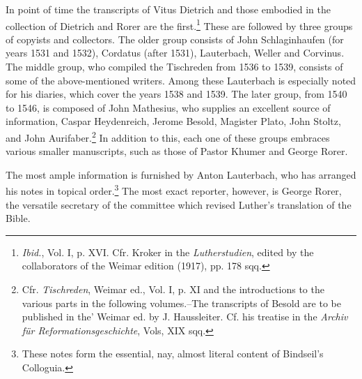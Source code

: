 In point of time the transcripts of Vitus Dietrich and those embodied in
the collection of Dietrich and Rorer are the first.\footnote
{\textit{Ibid.}, Vol. I, p. XVI. Cfr. Kroker in the \textit{Lutherstudien}, edited by the collaborators of
the Weimar edition (1917), pp. 178 sqq.}
These are followed by
three groups of copyists and collectors. The older group consists of John
Schlaginhaufen (for years 1531 and 1532), Cordatus (after 1531), Lauterbach,
Weller and Corvinus. The middle group, who compiled the Tischreden
from 1536 to 1539, consists of some of the above-mentioned writers. Among
these Lauterbach is especially noted for his diaries, which cover the years
1538 and 1539. The later group, from 1540 to 1546, is composed of John
Mathesius, who supplies an excellent source of information, Caspar Heydenreich,
Jerome Besold, Magister Plato, John Stoltz, and John Aurifaber.\footnote
{Cfr. \textit{Tischreden}, Weimar ed., Vol. I, p. XI and the introductions to the various parts in
the following volumes.--The transcripts of Besold are to be published in the' Weimar ed.
by J. Haussleiter. Cf. his treatise in the \textit{Archiv für Reformationsgeschichte}, Vols, XIX sqq.}
In addition to this, each one of these groups embraces various smaller manuscripts,
such as those of Pastor Khumer and George Rorer.

The most ample information is furnished by Anton Lauterbach, who has
arranged his notes in topical order.\footnote{These notes form the essential, nay, almost literal content of Bindseil’s Colloguia.}
 The most exact reporter, however, is
George Rorer, the versatile secretary of the committee which revised Luther’s
translation of the Bible.

